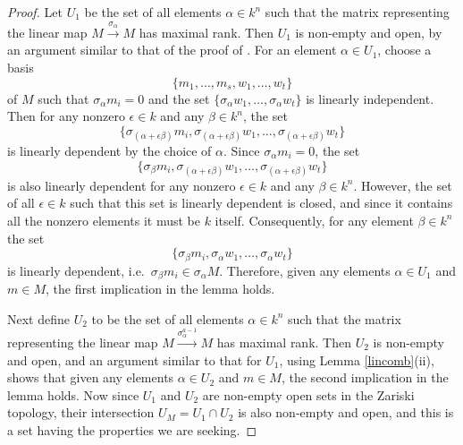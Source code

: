 \documentclass[a4paper]{amsart}
\theoremstyle{definition}
\theoremstyle{definition}
\theoremstyle{definition}
\theoremstyle{definition}
\theoremstyle{definition}
\theoremstyle{definition}
\theoremstyle{remark}
\theoremstyle{remark}
\theoremstyle{definition}
\theoremstyle{definition}
\begin{document}
\begin{proof}
Let $U_1$ be the set of all elements $\alpha \in k^n$ such that the
matrix representing the linear map $M \xrightarrow{\sigma_{\alpha}}
M$ has maximal rank. Then $U_1$ is non-empty and open, by an
argument similar to that of the proof of \cite[Lemma 9]{Oppermann1}.
For an element $\alpha \in U_1$, choose a basis
$$\{ m_1, \dots, m_s, w_1, \dots, w_t \}$$
of $M$ such that $\sigma_{\alpha} m_i =0$ and the set $\{
\sigma_{\alpha} w_1, \dots, \sigma_{\alpha} w_t \}$ is linearly
independent. Then for any nonzero $\epsilon \in k$ and any $\beta
\in k^n$, the set
$$\{ \sigma_{( \alpha + \epsilon \beta )} m_i, \sigma_{( \alpha + \epsilon
\beta )} w_1, \dots, \sigma_{( \alpha + \epsilon \beta )} w_t \}$$
is linearly dependent by the choice of $\alpha$. Since
$\sigma_{\alpha}m_i =0$, the set
$$\{ \sigma_{\beta} m_i, \sigma_{( \alpha + \epsilon
\beta )} w_1, \dots, \sigma_{( \alpha + \epsilon \beta )} w_t \}$$
is also linearly dependent for any nonzero $\epsilon \in k$ and any
$\beta \in k^n$. However, the set of all $\epsilon \in k$ such that
this set is linearly dependent is closed, and since it contains all
the nonzero elements it must be $k$ itself. Consequently, for any
element $\beta \in k^n$ the set
$$\{ \sigma_{\beta} m_i, \sigma_{\alpha} w_1, \dots, \sigma_{\alpha} w_t
\}$$ is linearly dependent, i.e.\  $\sigma_{\beta} m_i \in
\sigma_{\alpha} M$. Therefore, given any elements $\alpha \in U_1$
and $m \in M$, the first implication in the lemma holds.

Next define $U_2$ to be the set of all elements $\alpha \in k^n$
such that the matrix representing the linear map $M
\xrightarrow{\sigma_{\alpha}^{a-1}} M$ has maximal rank. Then $U_2$
is non-empty and open, and an argument similar to that for $U_1$,
using Lemma \ref{lincomb}(ii), shows that given any elements $\alpha
\in U_2$ and $m \in M$, the second implication in the lemma holds.
Now since $U_1$ and $U_2$ are non-empty open sets in the Zariski
topology, their intersection $U_M = U_1 \cap U_2$ is also non-empty
and open, and this is a set having the properties we are seeking.
\end{proof}
\end{document}
